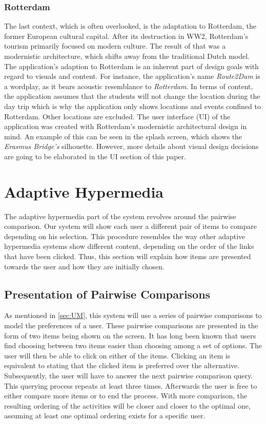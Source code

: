 \documentclass[11pt,a4paper,oneside]{article}
\begin{document}
\subsubsection{Rotterdam}
The last context, which is often overlooked, is the adaptation to Rotterdam, the former European cultural capital.\cite{hitters_SocialPoliticalConstruction_2000} After its destruction in WW2, Rotterdam's tourism primarily focused on modern culture.\cite{rotterdam} The result of that was a modernistic architecture, which shifts away from the traditional Dutch model. The application's adaption to Rotterdam is an inherent part of design goals with regard to visuals and content. For instance, the application's name \emph{Route2Dam} is a wordplay, as it bears acoustic resemblance to \emph{Rotterdam}. In terms of content, the application assumes that the students will not change the location during the day trip which is why the application only shows locations and events confined to Rotterdam. Other locations are excluded. The user interface (UI) of the application was created with Rotterdam's modernistic architectural design in mind. An example of this can be seen in the splash screen, which shows the \emph{Erasmus Bridge's} silhouette. However, more details about visual design decisions are going to be elaborated in the UI section of this paper.

\section{Adaptive Hypermedia}
\label{sec:adaptive_hm}
The adaptive hypermedia part of the system revolves around the pairwise comparison. Our system will show each user a different pair of items to compare depending on his selection. This procedure resembles the way other adaptive hypermedia systems show different content, depending on the order of the links that have been clicked. Thus, this section will explain how items are presented towards the user and how they are initially chosen. 

\subsection{Presentation of Pairwise Comparisons}
As mentioned in \autoref{sec:UM}, this system will use a series of pairwise comparisons to model the preferences of a user. These pairwise comparisons are presented in the form of two items being shown on the screen. It has long been known that users find choosing between two items easier than choosing among a set of options. The user will then be able to click on either of the items. Clicking an item is equivalent to stating that the clicked item is preferred over the alternative. Subsequently, the user will have to answer the next pairwise comparison query. This querying process repeats at least three times. Afterwards the user is free to either compare more items or to end the process. With more comparison, the resulting ordering of the activities will be closer and closer to the optimal one, assuming at least one optimal ordering exists for a specific user.
\end{document}
